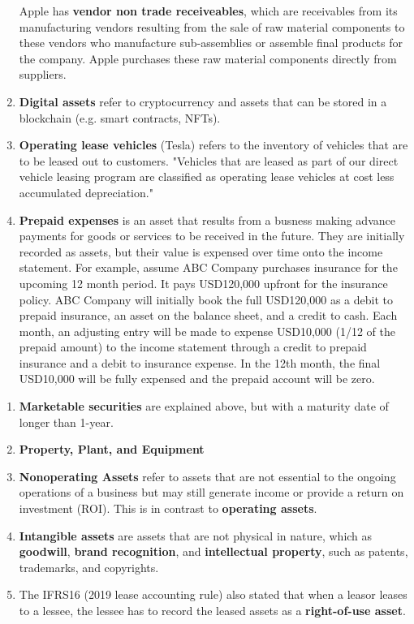 \documentclass{article}
\begin{document}
\begin{definition}
\begin{enumerate}
        Apple has \textbf{vendor non trade receiveables}, which are receivables from its manufacturing vendors resulting from the sale of raw material components to these vendors who manufacture sub-assemblies or assemble final products for the company. Apple purchases these raw material components directly from suppliers.
        \item \textbf{Digital assets} refer to cryptocurrency and assets that can be stored in a blockchain (e.g. smart contracts, NFTs).
        \item \textbf{Operating lease vehicles} (Tesla) refers to the inventory of vehicles that are to be leased out to customers. "Vehicles that are leased as part of our direct vehicle leasing program are classified as operating lease vehicles at cost less accumulated depreciation."
        \item \textbf{Prepaid expenses} is an asset that results from a busness making advance payments for goods or services to be received in the future. They are initially recorded as assets, but their value is expensed over time onto the income statement. For example, assume ABC Company purchases insurance for the upcoming 12 month period. It pays USD120,000 upfront for the insurance policy. ABC Company will initially book the full USD120,000 as a debit to prepaid insurance, an asset on the balance sheet, and a credit to cash. Each month, an adjusting entry will be made to expense USD10,000 (1/12 of the prepaid amount) to the income statement through a credit to prepaid insurance and a debit to insurance expense. In the 12th month, the final USD10,000 will be fully expensed and the prepaid account will be zero.
      \end{enumerate}
    \end{definition}

    \begin{definition}
      \begin{enumerate}
        \item \textbf{Marketable securities} are explained above, but with a maturity date of longer than 1-year.
        \item \textbf{Property, Plant, and Equipment}
        \item \textbf{Nonoperating Assets} refer to assets that are not essential to the ongoing operations of a business but may still generate income or provide a return on investment (ROI). This is in contrast to \textbf{operating assets}.
        \item \textbf{Intangible assets} are assets that are not physical in nature, which as \textbf{goodwill}, \textbf{brand recognition}, and \textbf{intellectual property}, such as patents, trademarks, and copyrights.
        \item The IFRS16 (2019 lease accounting rule) also stated that when a leasor leases to a lessee, the lessee has to record the leased assets as a \textbf{right-of-use asset}.
      \end{enumerate}
    \end{definition}
\end{document}
